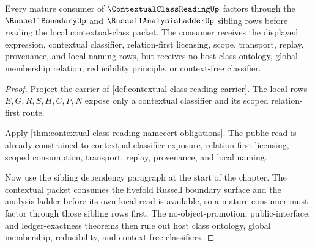 \begin{theorem}
\label{thm:contextual-class-reading-mature-sibling-route}
Every mature consumer of $\ContextualClassReadingUp$ factors through the $\RussellBoundaryUp$ and $\RussellAnalysisLadderUp$ sibling rows before reading the local contextual-class packet. The consumer receives the displayed expression, contextual classifier, relation-first licensing, scope, transport, replay, provenance, and local naming rows, but receives no host class ontology, global membership relation, reducibility principle, or context-free classifier.
\end{theorem}
\begin{proof}
Project the carrier of \autoref{def:contextual-class-reading-carrier}. The local rows $E,G,R,S,H,C,P,N$ expose only a contextual classifier and its scoped relation-first route.

Apply \autoref{thm:contextual-class-reading-namecert-obligations}. The public read is already constrained to contextual classifier exposure, relation-first licensing, scoped consumption, transport, replay, provenance, and local naming.

Now use the sibling dependency paragraph at the start of the chapter. The contextual packet consumes the fivefold Russell boundary surface and the analysis ladder before its own local read is available, so a mature consumer must factor through those sibling rows first. The no-object-promotion, public-interface, and ledger-exactness theorems then rule out host class ontology, global membership, reducibility, and context-free classifiers.
\end{proof}

\begin{closurestatus}{\ContextualClassReadingUp}
  \theoryclosure{\matureClosure}
  \formalstatus{\unformalizedV}
\end{closurestatus}
